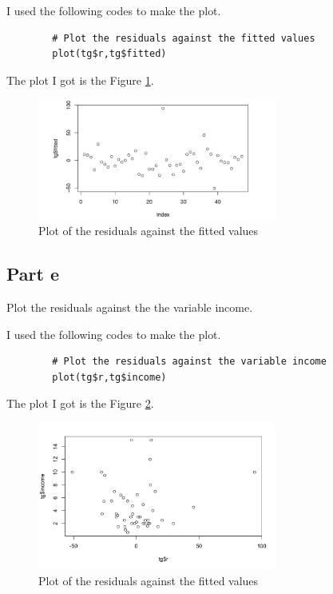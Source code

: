 \begin{answer}
    I used the following codes to make the plot.
    \begin{verbatim}
        # Plot the residuals against the fitted values
        plot(tg$r,tg$fitted)
    \end{verbatim}
    The plot I got is the Figure \ref{fig:fig6}.
    \begin{figure}[H]
        \centering
        \includegraphics[width=0.7\textwidth]{Figure 6.jpeg}
        \caption{\label{fig:fig6}Plot of the residuals against the fitted values}
    \end{figure}
\end{answer}

\subsection{Part e}

\begin{question}
    Plot the residuals against the the variable income.
\end{question}

\begin{answer}
    I used the following codes to make the plot.
    \begin{verbatim}
        # Plot the residuals against the variable income
        plot(tg$r,tg$income)
    \end{verbatim}
    The plot I got is the Figure \ref{fig:fig7}.
    \begin{figure}[H]
        \centering
        \includegraphics[width=0.7\textwidth]{Figure 7.jpeg}
        \caption{\label{fig:fig7}Plot of the residuals against the fitted values}
    \end{figure}
\end{answer}

